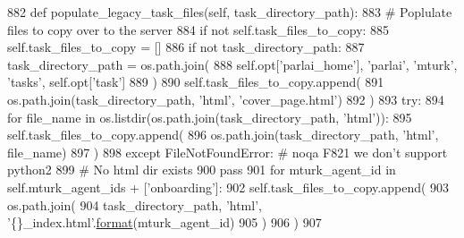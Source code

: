 \begin{DoxyCode}
882     \textcolor{keyword}{def }populate\_legacy\_task\_files(self, task\_directory\_path):
883         \textcolor{comment}{# Poplulate files to copy over to the server}
884         \textcolor{keywordflow}{if} \textcolor{keywordflow}{not} self.task\_files\_to\_copy:
885             self.task\_files\_to\_copy = []
886         \textcolor{keywordflow}{if} \textcolor{keywordflow}{not} task\_directory\_path:
887             task\_directory\_path = os.path.join(
888                 self.opt[\textcolor{stringliteral}{'parlai\_home'}], \textcolor{stringliteral}{'parlai'}, \textcolor{stringliteral}{'mturk'}, \textcolor{stringliteral}{'tasks'}, self.opt[\textcolor{stringliteral}{'task'}]
889             )
890         self.task\_files\_to\_copy.append(
891             os.path.join(task\_directory\_path, \textcolor{stringliteral}{'html'}, \textcolor{stringliteral}{'cover\_page.html'})
892         )
893         \textcolor{keywordflow}{try}:
894             \textcolor{keywordflow}{for} file\_name \textcolor{keywordflow}{in} os.listdir(os.path.join(task\_directory\_path, \textcolor{stringliteral}{'html'})):
895                 self.task\_files\_to\_copy.append(
896                     os.path.join(task\_directory\_path, \textcolor{stringliteral}{'html'}, file\_name)
897                 )
898         \textcolor{keywordflow}{except} FileNotFoundError:  \textcolor{comment}{# noqa F821 we don't support python2}
899             \textcolor{comment}{# No html dir exists}
900             \textcolor{keywordflow}{pass}
901         \textcolor{keywordflow}{for} mturk\_agent\_id \textcolor{keywordflow}{in} self.mturk\_agent\_ids + [\textcolor{stringliteral}{'onboarding'}]:
902             self.task\_files\_to\_copy.append(
903                 os.path.join(
904                     task\_directory\_path, \textcolor{stringliteral}{'html'}, \textcolor{stringliteral}{'\{\}\_index.html'}.\hyperlink{namespaceparlai_1_1chat__service_1_1services_1_1messenger_1_1shared__utils_a32e2e2022b824fbaf80c747160b52a76}{format}(mturk\_agent\_id)
905                 )
906             )
907 
\end{DoxyCode}
\mbox{\label{classparlai_1_1mturk_1_1core_1_1legacy__2018_1_1mturk__manager_1_1MTurkManager_ac2daab087671cae12533a48b94c98ea6}} 
